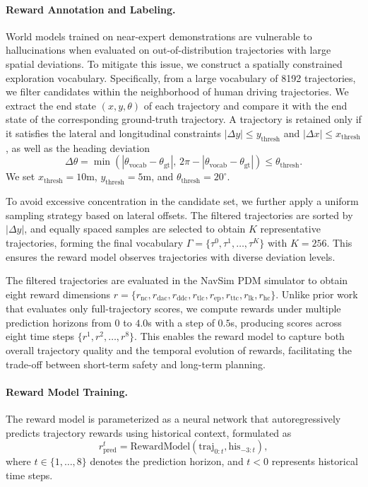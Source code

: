 \documentclass[runningheads]{llncs}
\begin{document}
\paragraph{\textbf{Reward Annotation and Labeling.}}
World models trained on near-expert demonstrations are vulnerable to hallucinations when evaluated on out-of-distribution trajectories with large spatial deviations. To mitigate this issue, we construct a spatially constrained exploration vocabulary.
Specifically, from a large vocabulary of 8192 trajectories, we filter candidates within the neighborhood of human driving trajectories. We extract the end state $(x,y,\theta)$ of each trajectory and compare it with the end state of the corresponding ground-truth trajectory. A trajectory is retained only if it satisfies the lateral and longitudinal constraints $|\Delta y|\le y_{\text{thresh}}$ and $|\Delta x|\le x_{\text{thresh}}$, as well as the heading deviation
\begin{equation}
\Delta \theta = \min(|\theta_{\text{vocab}}-\theta_{\text{gt}}|,\,2\pi-|\theta_{\text{vocab}}-\theta_{\text{gt}}|) \le \theta_{\text{thresh}}.
\end{equation}
We set $x_{\text{thresh}}=10$m, $y_{\text{thresh}}=5$m, and $\theta_{\text{thresh}}=20^\circ$.

To avoid excessive concentration in the candidate set, we further apply a uniform sampling strategy based on lateral offsets. The filtered trajectories are sorted by $|\Delta y|$, and equally spaced samples are selected to obtain $K$ representative trajectories, forming the final vocabulary $\Gamma=\{\tau^0,\tau^1,\dots,\tau^K\}$ with $K=256$. This ensures the reward model observes trajectories with diverse deviation levels.

The filtered trajectories are evaluated in the NavSim PDM simulator to obtain eight reward dimensions 
$r=\{r_{\text{nc}},r_{\text{dac}},r_{\text{ddc}},r_{\text{tlc}},r_{\text{ep}},r_{\text{ttc}},r_{\text{lk}},r_{\text{hc}}\}$.
Unlike prior work that evaluates only full-trajectory scores, we compute rewards under multiple prediction horizons from $0$ to $4.0$s with a step of $0.5$s, producing scores across eight time steps $\{r^1,r^2,\dots,r^8\}$. This enables the reward model to capture both overall trajectory quality and the temporal evolution of rewards, facilitating the trade-off between short-term safety and long-term planning.

\paragraph{\textbf{Reward Model Training.}}
The reward model is parameterized as a neural network that autoregressively predicts trajectory rewards using historical context, formulated as
\begin{equation}
r_{\text{pred}}^t=\text{RewardModel}(\text{traj}_{0:t},\text{his}_{-3:t}),
\end{equation}
where $t\in\{1,\dots,8\}$ denotes the prediction horizon, and $t<0$ represents historical time steps.
\end{document}
